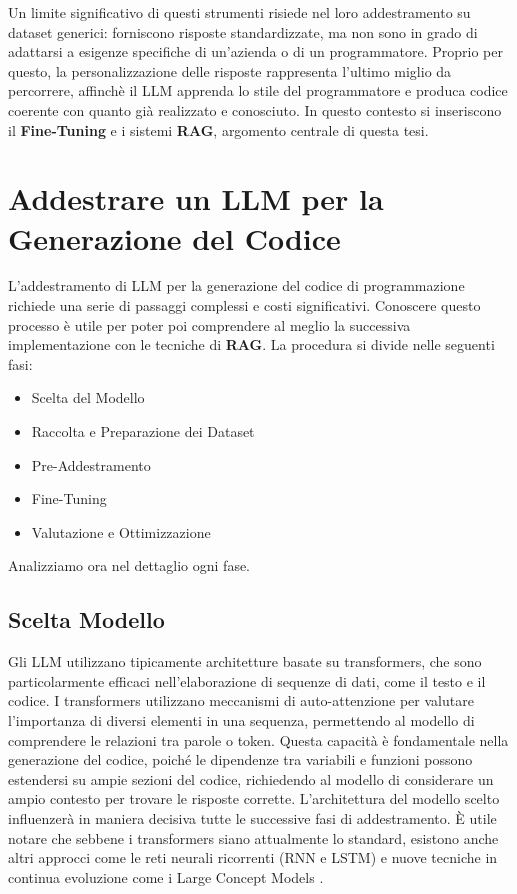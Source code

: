 \documentclass[12pt,a4paper,openright,twoside]{book}
\begin{document}
\newline
Un limite significativo di questi strumenti risiede nel loro addestramento su dataset generici: forniscono risposte standardizzate, ma non sono in grado di adattarsi a esigenze specifiche di un’azienda o di un programmatore.
Proprio per questo, la personalizzazione delle risposte rappresenta l'ultimo miglio da percorrere, affinchè il LLM apprenda lo stile del programmatore e produca codice coerente con quanto già realizzato e conosciuto.
In questo contesto si inseriscono il \textbf{Fine-Tuning} e i sistemi \textbf{RAG}, argomento centrale di questa tesi.

\chapter{Addestrare un LLM per la Generazione del Codice}
L'addestramento di LLM per la generazione del codice di programmazione richiede una serie di passaggi complessi e costi significativi.
Conoscere questo processo è utile per poter poi comprendere al meglio la successiva implementazione con le tecniche di \textbf{RAG}.
La procedura si divide nelle seguenti fasi:
\begin{itemize}
    \item Scelta del Modello
    \item Raccolta e Preparazione dei Dataset
    \item Pre-Addestramento
    \item Fine-Tuning
    \item Valutazione e Ottimizzazione
\end{itemize}
Analizziamo ora nel dettaglio ogni fase.
\section{Scelta Modello}
Gli LLM utilizzano tipicamente architetture basate su transformers, che sono particolarmente efficaci nell'elaborazione di sequenze di dati, come il testo e il codice.
I transformers utilizzano meccanismi di auto-attenzione per valutare l'importanza di diversi elementi in una sequenza,
permettendo al modello di comprendere le relazioni tra parole o token.
Questa capacità è fondamentale nella generazione del codice, poiché le dipendenze tra variabili e funzioni possono estendersi su ampie sezioni del codice, richiedendo al modello di considerare un ampio contesto per trovare le risposte corrette.
L'architettura del modello scelto influenzerà in maniera decisiva tutte le successive fasi di addestramento.
È utile notare che sebbene i transformers siano attualmente lo standard, esistono anche altri approcci come le reti neurali ricorrenti (RNN e LSTM) e nuove tecniche in continua evoluzione come i Large Concept Models \cite{code-llm-survey-2024}.
\end{document}
